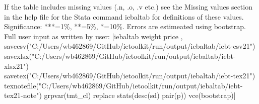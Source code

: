 If the table includes missing values (.n, .o, .v etc.) see the Missing values section in the help file for the Stata command iebaltab for definitions of these values. Significance: ***=1\%, **=5\%, *=10\%. Errors are estimeated using bootstrap. Full user input as written by user: [iebaltab weight price , savecsv("C:/Users/wb462869/GitHub/ietoolkit/run/output/iebaltab/iebt-csv21") savexlsx("C:/Users/wb462869/GitHub/ietoolkit/run/output/iebaltab/iebt-xlsx21") savetex("C:/Users/wb462869/GitHub/ietoolkit/run/output/iebaltab/iebt-tex21") texnotefile("C:/Users/wb462869/GitHub/ietoolkit/run/output/iebaltab/iebt-tex21-note") grpvar(tmt\_cl) replace stats(desc(sd) pair(p)) vce(bootstrap)]
